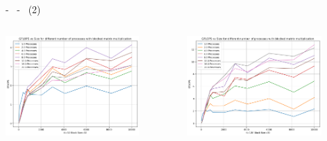 \documentclass[compress]{beamer}
\begin{document}
\begin{frame}{\secname \text{ }- \subsecname\ \text{ }- \subsubsecname\ (2)}
    \begin{columns}
            \begin{minipage}{1\textwidth}
                \centering
                \begin{adjustbox}{margin=0cm 0cm 0cm 0cm, center} %
                    \includegraphics[width=0.8\textwidth, frame]{resources/rettangolari_k32_blocked.png}
                \end{adjustbox}
                \begin{adjustbox}{margin=0cm 0cm 0cm 0.1cm, center} %
                    \includegraphics[width=0.8\textwidth, frame]{resources/rettangolari_k128_blocked.png}
                \end{adjustbox}
            \end{minipage}
            \begin{minipage}{1\textwidth}

\end{minipage}
\end{columns}
\end{frame}
\end{document}
